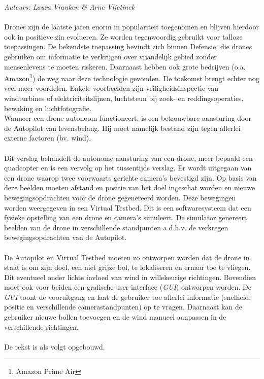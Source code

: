 {\em Auteurs: Laura Vranken \& Arne Vlietinck}
\\\\
\noindent
Drones zijn de laatste jaren enorm in populariteit toegenomen en blijven hierdoor ook in positieve zin evolueren. Ze worden tegenwoordig gebruikt voor talloze toepassingen. De bekendste toepassing bevindt zich binnen Defensie, die drones gebruiken om informatie te verkrijgen over vijandelijk gebied zonder mensenlevens te moeten riskeren. Daarnaast hebben ook grote bedrijven (o.a. Amazon\footnote{Amazon Prime Air}) de weg naar deze technologie gevonden. De toekomst brengt echter nog veel meer voordelen. Enkele voorbeelden zijn veiligheidsinspectie van windturbines of elektriciteitslijnen, luchtsteun bij zoek- en reddingsoperaties, bewaking en luchtfotografie. \cite{website:microdrones}
\\
Wanneer een drone autonoom functioneert, is een betrouwbare aansturing door de Autopilot van levensbelang. Hij moet namelijk bestand zijn tegen allerlei externe factoren (bv. wind).
\\
\\
Dit verslag behandelt de autonome aansturing van een drone, meer bepaald een quadcopter en is een vervolg op het tussentijds verslag. \cite{arcticle:tssnTijds} Er wordt uitgegaan van een drone waarop twee voorwaarts gerichte camera's bevestigd zijn. Op basis van deze beelden moeten afstand en positie van het doel ingeschat worden en nieuwe bewegingsopdrachten voor de drone gegenereerd worden. Deze bewegingen worden weergegeven in een Virtual Testbed. Dit is een softwaresysteem dat een fysieke opstelling van een drone en camera's simuleert. \cite{arcticle:opgavePeno} De simulator genereert beelden van de drone in verschillende standpunten a.d.h.v. de verkregen bewegingsopdrachten van de Autopilot. 
\\
\\
De Autopilot en Virtual Testbed moeten zo ontworpen worden dat de drone in staat is om zijn doel, een niet grijze bol, te lokaliseren en ernaar toe te vliegen. Dit eventueel onder lichte invloed van wind in willekeurige richtingen. Bovendien moet ook voor beiden een grafische user interface (\textit{GUI}) ontworpen worden. De \textit{GUI} toont de vooruitgang en laat de gebruiker toe allerlei informatie (snelheid, positie en verschillende camerastandpunten) op te vragen. Daarnaast kan de gebruiker nieuwe bollen toevoegen en de wind manueel aanpassen in de verschillende richtingen. 
\\
\\
De tekst is als volgt opgebouwd. %


